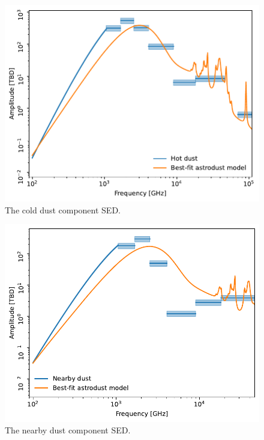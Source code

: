 \documentclass{aa}
\begin{document}
\begin{figure}
  \centering
  \includegraphics[width=\columnwidth]{figures/hot_dust_sed.pdf}
  \caption{The cold dust component SED.}
  \label{fig:hot_dust_sed}
\end{figure}
\begin{figure}
  \centering
  \includegraphics[width=\columnwidth]{figures/nearby_dust_sed.pdf}
  \caption{The nearby dust component SED.}
  \label{fig:nearby_dust_sed}
\end{figure}
\end{document}
